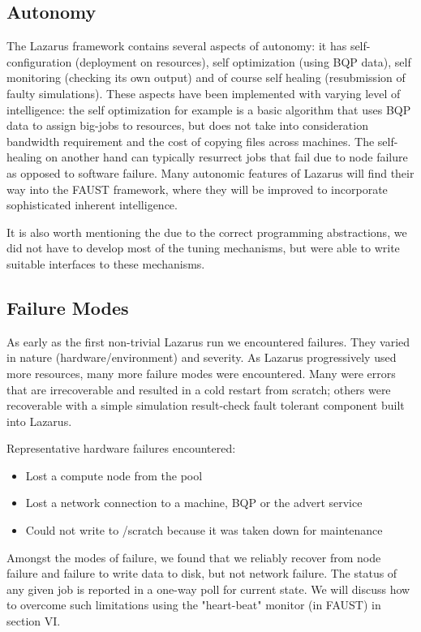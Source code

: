 \documentclass{sig-alternate}
\begin{document}
\subsection{Autonomy}
The Lazarus framework contains several aspects of autonomy: it has
self-configuration (deployment on resources), self optimization (using
BQP data), self monitoring (checking its own output) and of course
self healing (resubmission of faulty simulations). These aspects have
been implemented with varying level of intelligence: the self
optimization for example is a basic algorithm that uses BQP data to
assign big-jobs to resources, but does not take into consideration
bandwidth requirement and the cost of copying files across
machines. The self-healing on another hand can typically resurrect
jobs that fail due to node failure as opposed to software
failure. Many autonomic features of Lazarus will find their way into
the FAUST framework, where they will be improved to incorporate
sophisticated inherent intelligence.  

It is also worth mentioning the due to the correct programming
abstractions, we did not have to develop most of the tuning
mechanisms, but were able to write suitable interfaces to these
mechanisms.


\subsection{Failure Modes}
As early as the first non-trivial Lazarus run we encountered failures. They
varied in nature (hardware/environment) and severity. As Lazarus progressively
used more resources, many more failure modes were encountered.
Many were errors that are irrecoverable and resulted in a
cold restart from scratch; others were recoverable with a simple simulation 
result-check fault tolerant component built into Lazarus.

Representative hardware failures encountered:
\begin{itemize}\addtolength{\itemsep}{-0.8\baselineskip}
\item{Lost a compute node from the pool}
\item{Lost a network connection to a machine, BQP or the advert service}
\item{Could not write to /scratch because it was taken down for maintenance}
\end{itemize}
Amongst the modes of failure, we found that we reliably recover from node failure and failure to write data to disk, but not network failure. The status of any given job is reported in a one-way poll for current state.  We will discuss how to overcome such limitations using the "heart-beat" monitor (in FAUST) in section VI.
\end{document}
